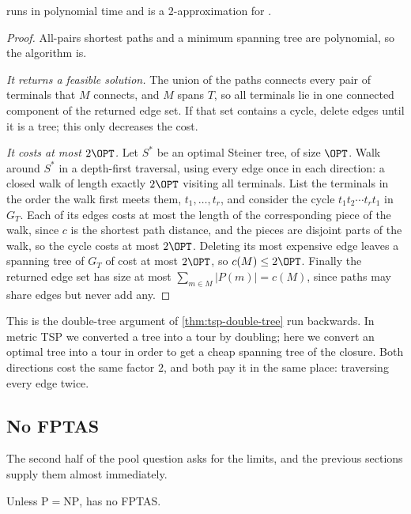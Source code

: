 \begin{theorem}\label{thm:steiner-2approx}
 runs in polynomial time and is a $2$-approximation for
.
\end{theorem}

\begin{proof}
All-pairs shortest paths and a minimum spanning tree are polynomial, so the
algorithm is.

\emph{It returns a feasible solution.} The union of the paths connects every
pair of terminals that $M$ connects, and $M$ spans $T$, so all terminals lie in
one connected component of the returned edge set. If that set contains a cycle,
delete edges until it is a tree; this only decreases the cost.

\emph{It costs at most $2\OPT$.} Let $S^{*}$ be an optimal Steiner tree, of size
$\OPT$. Walk around $S^{*}$ in a depth-first traversal, using every edge once in
each direction: a closed walk of length exactly $2\OPT$ visiting all terminals.
List the terminals in the order the walk first meets them, $t_1, \dots, t_r$,
and consider the cycle $t_1 t_2 \cdots t_r t_1$ in $G_T$. Each of its edges
costs at most the length of the corresponding piece of the walk, since $c$ is
the shortest path distance, and the pieces are disjoint parts of the walk, so
the cycle costs at most $2\OPT$. Deleting its most expensive edge leaves a
spanning tree of $G_T$ of cost at most $2\OPT$, so $c(M) \le 2\OPT$. Finally the
returned edge set has size at most $\sum_{m \in M} |P(m)| = c(M)$, since paths
may share edges but never add any.
\end{proof}

\begin{intuition}
This is the double-tree argument of \cref{thm:tsp-double-tree} run backwards. In
metric TSP we converted a tree into a tour by doubling; here we convert an
optimal tree into a tour in order to get a cheap spanning tree of the closure.
Both directions cost the same factor $2$, and both pay it in the same place:
traversing every edge twice.
\end{intuition}

\subsection{No FPTAS}

The second half of the pool question asks for the limits, and the previous
sections supply them almost immediately.

\begin{theorem}\label{thm:steiner-no-fptas}
Unless $\mathrm{P} = \mathrm{NP}$,  has no FPTAS.
\end{theorem}

